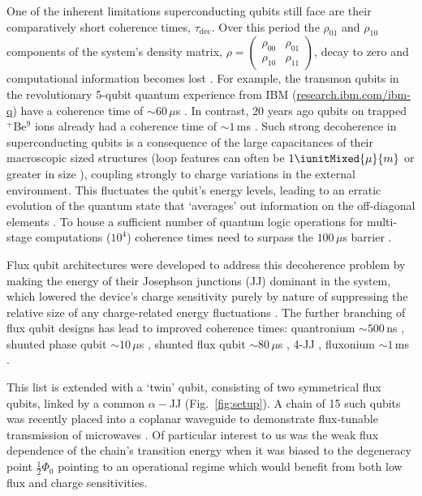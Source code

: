 One  of the  inherent limitations  superconducting  qubits still  face are  their
comparatively  short coherence  times,  $\tau_{\text{dec}}$.  Over  this period  the
$\rho_{01}$   and   $\rho_{10}$   components    of   the   system's   density   matrix,
$\rho  =   \ensuremath{\left(\begin{smallmatrix}  \rho_{00}   &  \rho_{01}  \\   \rho_{10}  &
      \rho_{11}  \end{smallmatrix}\right)}  $,  decay   to  zero  and  computational
information becomes  lost \cite{phaseExp}.  For  example, the transmon  qubits in
the      revolutionary     5-qubit      quantum      experience     from      IBM
(\href{http://www.research.ibm.com/ibm-q}{research.ibm.com/ibm-q})     have     a
coherence time of $ \sim 60\,\mu $s \cite{linke2017}. In contrast, 20 years ago qubits
on trapped  $ ^{+} $Be$  ^{9} $ ions  already had a  coherence time of  $\sim1\, $ms
\cite{monroe1995}.   Such  strong  decoherence  in superconducting  qubits  is  a
consequence of the large capacitances of their macroscopic sized structures (loop
features   can   often   be   $    1\iunitMixed{\mu}{m}$   or   greater   in   size
\cite{Astafiev2010}\cite{hoi2011}\cite{johnson2010}), coupling strongly to charge
variations  in the  external  environment.  This  fluctuates  the qubit's  energy
levels, leading to an erratic evolution  of the quantum state that `averages' out
information  on  the  off-diagonal   elements  \cite{devoret2008}.   To  house  a
sufficient  number  of  quantum  logic operations  for  multi-stage  computations
($  10^4   $)  coherence   times  need   to  surpass   the  $   100\,\mu$s  barrier
\cite{orlando1999}.
 
Flux qubit  architectures were developed  to address this decoherence  problem by
making the energy of their Josephson junctions (JJ) dominant in the system, which
lowered  the device's  charge sensitivity  purely  by nature  of suppressing  the
relative     size      of     any     charge-related      energy     fluctuations
\cite{orlando1999}\cite{chiorescu2003}\cite{mooij1999}.  The further branching of
flux  qubit   designs  has   lead  to   improved  coherence   times:  quantronium
$\sim500\,$ns     \cite{cottet2002}    \cite{gu2017},     shunted    phase     qubit
$\sim10\,\mu $s \cite{stern2014} , shunted  flux qubit $\sim80\,\mu$s \cite{yan2016} , 4-JJ
\cite{qui2016}, fluxonium $\sim1\,$ms \cite{pop2014}.
 
This list  is extended with  a `twin' qubit,  consisting of two  symmetrical flux
qubits, linked  by a common $  \alpha-$JJ (Fig.~\ref{fig:setup}).  A chain  of 15 such
qubits was recently placed into  a coplanar waveguide to demonstrate flux-tunable
transmission of  microwaves \cite{shulga2018}. Of  particular interest to  us was
the weak flux dependence  of the chain's transition energy when  it was biased to
the degeneracy  point $\frac{1}{2}\Phi_0 $  pointing to an operational  regime which
would benefit from both low flux and charge sensitivities.
 
